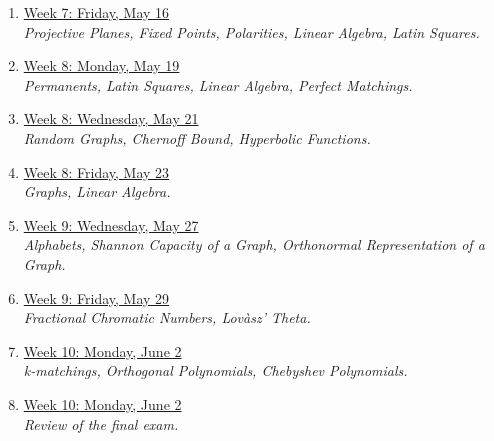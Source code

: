 \documentclass[12pt]{article}
\theoremstyle{remark}
\begin{document}
\begin{enumerate}
\item \hyperref[21]{Week 7: Friday, May 16 }
\\\indent\textit{Projective Planes, Fixed Points, Polarities, Linear Algebra, Latin Squares.}

\item \hyperref[22]{Week 8: Monday, May 19 }
\\\indent\textit{Permanents, Latin Squares, Linear Algebra, Perfect Matchings.}

\item \hyperref[23]{Week 8: Wednesday, May 21 }
\\\indent\textit{Random Graphs, Chernoff Bound, Hyperbolic Functions.}

\item \hyperref[24]{Week 8: Friday, May 23 }
\\\indent\textit{Graphs, Linear Algebra.}

\item \hyperref[25]{Week 9: Wednesday, May 27 }
\\\indent\textit{Alphabets, Shannon Capacity of a Graph, Orthonormal Representation of a Graph.}

\item \hyperref[26]{Week 9: Friday, May 29}
\\\indent\textit{Fractional Chromatic Numbers, Lov{\`a}sz' Theta.}

\item \hyperref[27]{Week 10: Monday, June 2}
\\\indent\textit{k-matchings, Orthogonal Polynomials, Chebyshev Polynomials.}

\item \hyperref[28]{Week 10: Monday, June 2}
\\\indent\textit{Review of the final exam.}
\end{enumerate}
\end{document}
